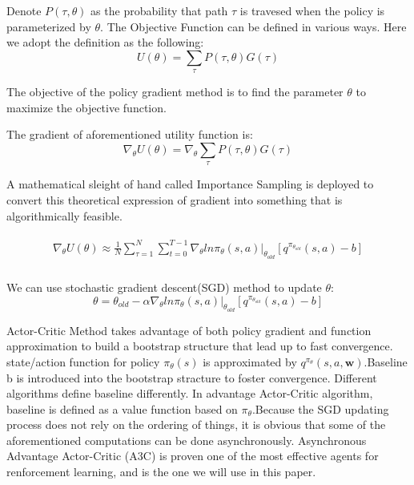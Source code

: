 \documentclass[journal]{IEEEtran}
\begin{document}
Denote $P(\tau,\theta)$ as the probability that path $\tau$ is travesed when the policy is parameterized by $\theta$. The Objective Function can be defined in various ways. Here we adopt the definition as the following:
\begin{equation}
    U(\theta)=\sum_{\tau}P(\tau,\theta)G(\tau)
\end{equation}


The objective of the policy gradient method is to find the parameter $\theta$ to maximize the objective function.

The gradient of aforementioned utility function is:
\begin{equation}
    \nabla_{\theta} U(\theta)= \nabla_{\theta}\sum_{\tau}P(\tau,\theta) G(\tau)
\end{equation}

A mathematical sleight of hand called Importance Sampling is deployed to convert this theoretical expression of gradient into something that is algorithmically feasible.

\begin{align}
\begin{split}
\nabla_{\theta} U(\theta) \approx \frac{1}{N}\displaystyle\sum_{\tau=1}^{N}\displaystyle\sum_{t=0}^{T-1} \nabla_{\theta}ln\pi_{\theta}(s,a)|_{\theta_{old}}[q^{\pi_{\theta_{old}}}(s,a)-b]\\
\end{split}
\end{align}

We can use stochastic gradient descent(SGD) method to update $\theta$:
\begin{equation}
    \theta=\theta_{old}-\alpha \nabla_{\theta}ln\pi_{\theta}(s,a)|_{\theta_{old}}[q^{\pi_{\theta_{old}}}(s,a)-b]
\end{equation}

Actor-Critic Method takes advantage of both policy gradient and function approximation to build a bootstrap structure that lead up to fast convergence. state/action function for policy $\pi_{\theta}(s)$ is approximated by $q^{\pi_{\theta}}(s,a,\textbf{w})$.Baseline b is introduced into the bootstrap stracture to foster convergence. Different algorithms define baseline differently. In advantage Actor-Critic algorithm, baseline is defined as a value function based on $\pi_{\theta}$.Because the SGD updating process does not rely on the ordering of things, it is obvious that some of the aforementioned computations can be done asynchronously. Asynchronous Advantage Actor-Critic (A3C) is proven one of the most effective agents for renforcement learning, and is the one we will use in this paper.
\end{document}
